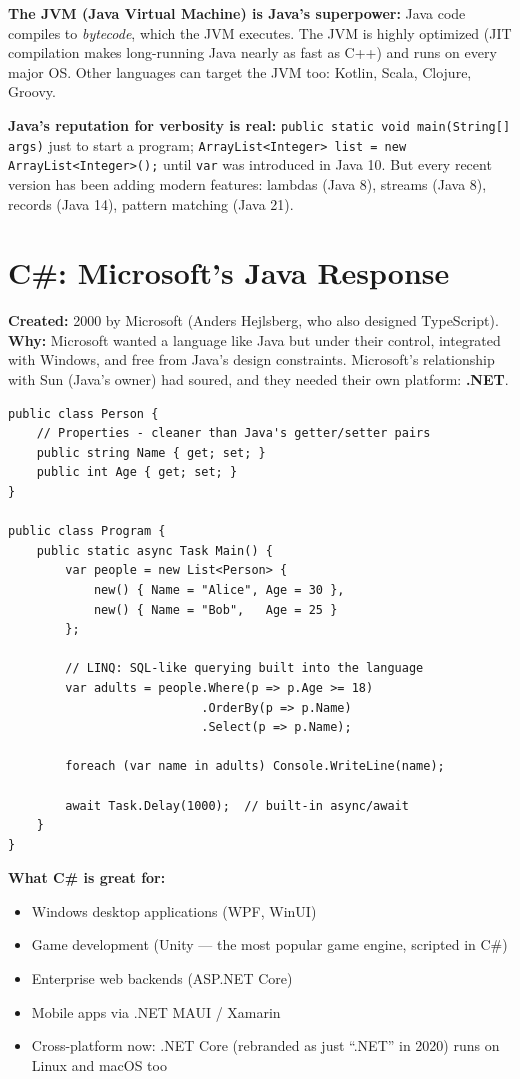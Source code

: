 \documentclass[11pt, letterpaper]{article}
\begin{document}
\textbf{The JVM (Java Virtual Machine) is Java's superpower:} Java code compiles to \emph{bytecode}, which the JVM executes. The JVM is highly optimized (JIT compilation makes long-running Java nearly as fast as C++) and runs on every major OS. Other languages can target the JVM too: Kotlin, Scala, Clojure, Groovy.

\textbf{Java's reputation for verbosity is real:} \texttt{public static void main(String[] args)} just to start a program; \texttt{ArrayList<Integer> list = new ArrayList<Integer>();} until \texttt{var} was introduced in Java 10. But every recent version has been adding modern features: lambdas (Java 8), streams (Java 8), records (Java 14), pattern matching (Java 21).

\section*{C\#: Microsoft's Java Response}

\textbf{Created:} 2000 by Microsoft (Anders Hejlsberg, who also designed TypeScript). \textbf{Why:} Microsoft wanted a language like Java but under their control, integrated with Windows, and free from Java's design constraints. Microsoft's relationship with Sun (Java's owner) had soured, and they needed their own platform: \textbf{.NET}.

\begin{lstlisting}[style=code, caption={C\#: properties, LINQ, and async}]
public class Person {
    // Properties - cleaner than Java's getter/setter pairs
    public string Name { get; set; }
    public int Age { get; set; }
}

public class Program {
    public static async Task Main() {
        var people = new List<Person> {
            new() { Name = "Alice", Age = 30 },
            new() { Name = "Bob",   Age = 25 }
        };

        // LINQ: SQL-like querying built into the language
        var adults = people.Where(p => p.Age >= 18)
                           .OrderBy(p => p.Name)
                           .Select(p => p.Name);

        foreach (var name in adults) Console.WriteLine(name);

        await Task.Delay(1000);  // built-in async/await
    }
}
\end{lstlisting}

\textbf{What C\# is great for:}
\begin{itemize}[noitemsep]
  \item Windows desktop applications (WPF, WinUI)
  \item Game development (Unity --- the most popular game engine, scripted in C\#)
  \item Enterprise web backends (ASP.NET Core)
  \item Mobile apps via .NET MAUI / Xamarin
  \item Cross-platform now: .NET Core (rebranded as just ``.NET'' in 2020) runs on Linux and macOS too
\end{itemize}
\end{document}

